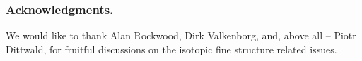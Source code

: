 \subsubsection*{Acknowledgments.}

We would like to thank Alan Rockwood, Dirk Valkenborg, and, above all -- Piotr Dittwald, for fruitful discussions on the isotopic fine structure related issues.
